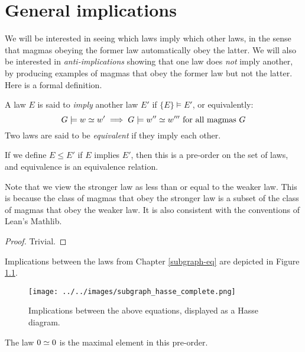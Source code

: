 \chapter{General implications}

We will be interested in seeing which laws imply which other laws, in the sense that magmas obeying the former law automatically obey the latter.  We will also be interested in \emph{anti-implications} showing that one law does \emph{not} imply another, by producing examples of magmas that obey the former law but not the latter. Here is a formal definition.

\begin{definition}[Implication]\label{impl}  A law $E$ is said to \emph{imply} another law $E'$ if $\{E\} \models E'$, or equivalently:
  $$ G \models w  \simeq  w' \implies G \models w''  \simeq  w''' \hbox{ for all magmas } G$$
Two laws are said to be \emph{equivalent} if they imply each other.
\end{definition}

\begin{lemma}\leanok\label{pre-order}  If we define $E \leq E'$ if $E$ implies $E'$, then this is a pre-order on the set of laws, and equivalence is an equivalence relation.
\end{lemma}

Note that we view the stronger law as less than or equal to the weaker law.  This is because the class of magmas that obey the stronger law is a subset of the class of magmas that obey the weaker law.  It is also consistent with the conventions of Lean's Mathlib.

\begin{proof}\leanok Trivial.
\end{proof}

Implications between the laws from Chapter \ref{subgraph-eq} are depicted in Figure \ref{fig:implications}.

\begin{figure}
  \centering
  \texttt{[image: ../../images/subgraph\_hasse\_complete.png]}
  \caption{Implications between the above equations, displayed as a Hasse diagram.}
  \label{fig:implications}
\end{figure}


\begin{lemma}\label{maximal}\leanok The law $0  \simeq  0$ is the maximal element in this pre-order.
\end{lemma}

